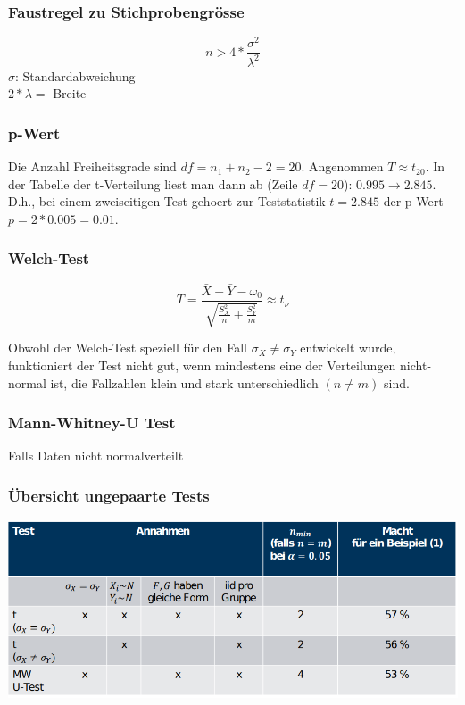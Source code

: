 \documentclass{article}
\begin{document}
\begin{multicols*}{3}
      \subsubsection{Faustregel zu Stichprobengrösse}
      $$n >4*\frac{\sigma^2}{\lambda^2}$$
      $\sigma$: Standardabweichung
      \\$2*\lambda = $ Breite

      \subsubsection{p-Wert}

      Die Anzahl Freiheitsgrade sind $df= n_1 + n_2  - 2 = 20$. Angenommen $T \approx t_{20}$.
      In der Tabelle der t-Verteilung liest man dann ab (Zeile $df=20$): $0.995 \rightarrow 2.845$. D.h.,
      bei einem zweiseitigen Test gehoert zur Teststatistik $t=2.845$ der p-Wert $p=2*0.005=0.01$.

      \subsubsection{Welch-Test}

      $$T={\frac  {{\bar  X}-{\bar  Y}-\omega _{0}}{{\sqrt  {{\frac  {S_{X}^{2}}n}+{\frac  {S_{Y}^{2}}m}}}}}\approx t_{\nu }$$

      Obwohl der Welch-Test speziell für den Fall ${\displaystyle \sigma _{X}\neq \sigma _{Y}}$ entwickelt wurde,
      funktioniert der Test nicht gut, wenn mindestens eine der Verteilungen nicht-normal ist, die Fallzahlen klein und stark unterschiedlich
      $( {\displaystyle n\neq m})$ sind.

      \subsubsection{Mann-Whitney-U Test}
      Falls Daten nicht normalverteilt

      \subsubsection{Übersicht ungepaarte Tests}

      \includegraphics[scale=0.26, angle=0]{stich}


\end{multicols*}
\end{document}
